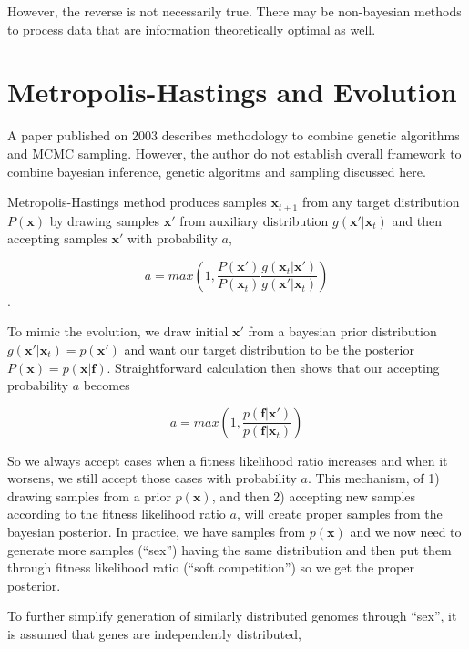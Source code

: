\documentclass{article}
\begin{document}
However, the reverse is not necessarily true.  There may be non-bayesian methods to process data that are information theoretically optimal as well.

\section{Metropolis-Hastings and Evolution}

A paper published on 2003 \cite{strens03} describes methodology to combine genetic algorithms and MCMC sampling. However, the author do not establish overall framework to combine bayesian inference, genetic algoritms and sampling discussed here.

Metropolis-Hastings method \cite{bdanalysis03} produces samples $\mathbf{x}_{t+1}$ from any target distribution $P(\mathbf{x})$ by drawing samples $\mathbf{x}'$ from auxiliary distribution $g(\mathbf{x}'|\mathbf{x}_t)$ and then accepting samples $\mathbf{x}'$ with probability $a$,

\begin{equation}
  \label{mcmcsampling1}
  a = max(1, \frac{P(\mathbf{x}')}{P(\mathbf{x}_t)} \frac{g(\mathbf{x}_t|\mathbf{x}')}{g(\mathbf{x}'|\mathbf{x}_t)})
\end{equation}.

To mimic the evolution, we draw initial $\mathbf{x}'$ from a bayesian prior distribution $g(\mathbf{x}'|\mathbf{x}_t) = p(\mathbf{x}')$ and want our target distribution to be the posterior $P(\mathbf{x}) = p(\mathbf{x}|\mathbf{f})$. Straightforward calculation then shows that our accepting probability $a$ becomes

\begin{equation}
  \label{mcmcsampling2}
  a = max(1, \frac{p(\mathbf{f}|\mathbf{x}')}{p(\mathbf{f}|\mathbf{x}_t)})
\end{equation}

So we always accept cases when a fitness likelihood ratio increases and when it worsens, we still accept those cases with probability $a$. This mechanism, of 1) drawing samples from a prior $p(\mathbf{x})$, and then 2) accepting new samples according to the fitness likelihood ratio $a$, will create proper samples from the bayesian posterior. In practice, we have samples from $p(\mathbf{x})$ and we now need to generate more samples (``sex'') having the same distribution and then put them through fitness likelihood ratio (``soft competition'') so we get the proper posterior.
 
To further simplify generation of similarly distributed genomes through ``sex'', it is assumed that genes are independently distributed,
\end{document}
